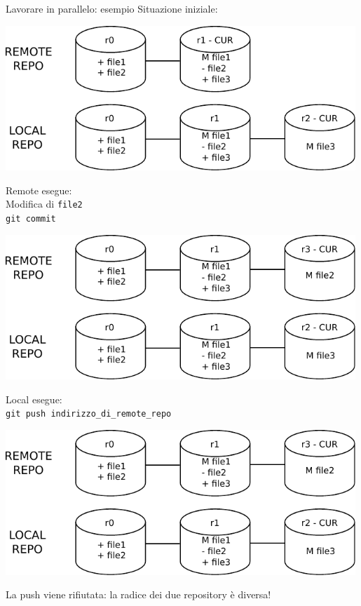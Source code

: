 \documentclass[xcolor=dvipsnames,presentation]{beamer}
\begin{document}
\begin{frame}{Lavorare in parallelo: esempio}
	Situazione iniziale:
	\begin{center}
		\includegraphics[width=0.99\textwidth]{img/draw5}
	\end{center}
	\framebreak{}

	Remote esegue:\\
	Modifica di \texttt{file2} \\
	\texttt{git commit} \\
	\begin{center}
		\includegraphics[width=0.99\textwidth]{img/draw7}
	\end{center}
	\framebreak{}

	Local esegue:\\
	\texttt{git push indirizzo\_di\_remote\_repo} \\
	\begin{center}
		\includegraphics[width=0.99\textwidth]{img/draw7}
	\end{center}
	La push viene rifiutata: la radice dei due repository è diversa!
	\framebreak{}


\end{frame}
\end{document}
